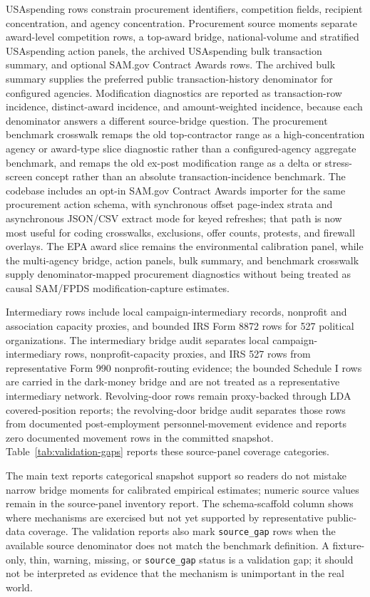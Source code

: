 USAspending rows constrain procurement identifiers, competition fields, recipient concentration, and agency concentration. Procurement source moments separate award-level competition rows, a top-award bridge, national-volume and stratified USAspending action panels, the archived USAspending bulk transaction summary, and optional SAM.gov Contract Awards rows. The archived bulk summary supplies the preferred public transaction-history denominator for configured agencies. Modification diagnostics are reported as transaction-row incidence, distinct-award incidence, and amount-weighted incidence, because each denominator answers a different source-bridge question. The procurement benchmark crosswalk remaps the old top-contractor range as a high-concentration agency or award-type slice diagnostic rather than a configured-agency aggregate benchmark, and remaps the old ex-post modification range as a delta or stress-screen concept rather than an absolute transaction-incidence benchmark. The codebase includes an opt-in SAM.gov Contract Awards importer for the same procurement action schema, with synchronous offset page-index strata and asynchronous JSON/CSV extract mode for keyed refreshes; that path is now most useful for coding crosswalks, exclusions, offer counts, protests, and firewall overlays. The EPA award slice remains the environmental calibration panel, while the multi-agency bridge, action panels, bulk summary, and benchmark crosswalk supply denominator-mapped procurement diagnostics without being treated as causal SAM/FPDS modification-capture estimates.

Intermediary rows include local campaign-intermediary records, nonprofit and association capacity proxies, and bounded IRS Form 8872 rows for 527 political organizations. The intermediary bridge audit separates local campaign-intermediary rows, nonprofit-capacity proxies, and IRS 527 rows from representative Form 990 nonprofit-routing evidence; the bounded Schedule I rows are carried in the dark-money bridge and are not treated as a representative intermediary network. Revolving-door rows remain proxy-backed through LDA covered-position reports; the revolving-door bridge audit separates those rows from documented post-employment personnel-movement evidence and reports zero documented movement rows in the committed snapshot. Table~\ref{tab:validation-gaps} reports these source-panel coverage categories.



The main text reports categorical snapshot support so readers do not mistake narrow bridge moments for calibrated empirical estimates; numeric source values remain in the source-panel inventory report. The schema-scaffold column shows where mechanisms are exercised but not yet supported by representative public-data coverage. The validation reports also mark \texttt{source\_gap} rows when the available source denominator does not match the benchmark definition. A fixture-only, thin, warning, missing, or \texttt{source\_gap} status is a validation gap; it should not be interpreted as evidence that the mechanism is unimportant in the real world.

